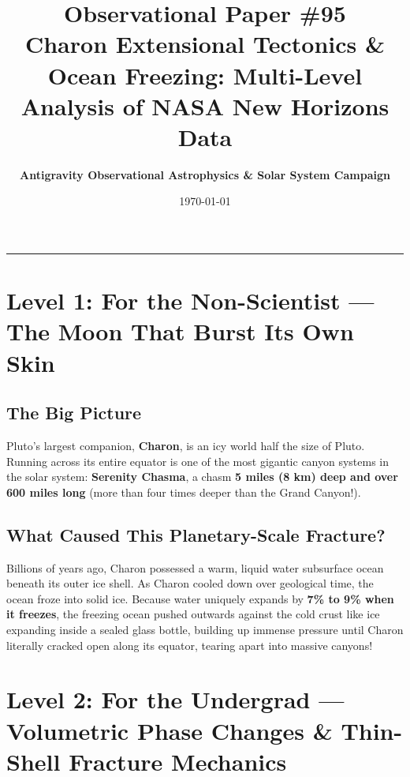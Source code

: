 \documentclass[11pt,a4paper]{article}
\title{\Huge \textbf{Observational Paper \#95}\\ \Large Charon Extensional Tectonics \& Ocean Freezing: Multi-Level Analysis of NASA New Horizons Data}
\author{\textbf{Antigravity Observational Astrophysics \& Solar System Campaign}}
\date{\today}
\begin{document}
\maketitle

\vspace{-1em}
\begin{center}
\rule{\textwidth}{1.5pt}
\end{center}

\section*{Level 1: For the Non-Scientist — The Moon That Burst Its Own Skin}

\subsection*{The Big Picture}
Pluto's largest companion, \textbf{Charon}, is an icy world half the size of Pluto. Running across its entire equator is one of the most gigantic canyon systems in the solar system: \textbf{Serenity Chasma}, a chasm \textbf{5 miles (8 km) deep and over 600 miles long} (more than four times deeper than the Grand Canyon!).

\subsection*{What Caused This Planetary-Scale Fracture?}
Billions of years ago, Charon possessed a warm, liquid water subsurface ocean beneath its outer ice shell. As Charon cooled down over geological time, the ocean froze into solid ice. Because water uniquely expands by \textbf{7\% to 9\% when it freezes}, the freezing ocean pushed outwards against the cold crust like ice expanding inside a sealed glass bottle, building up immense pressure until Charon literally cracked open along its equator, tearing apart into massive canyons!

\newpage

\section*{Level 2: For the Undergrad — Volumetric Phase Changes \& Thin-Shell Fracture Mechanics}
\end{document}
